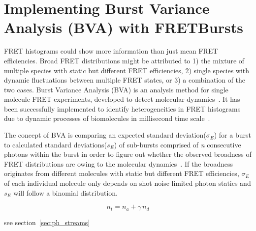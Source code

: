 \section{Implementing Burst Variance Analysis (BVA) with FRETBursts}

FRET histograms could show more information than just mean FRET efficiencies. Broad FRET distributions might be attributed to 1) the mixture of multiple species with static but different FRET efficiencies, 2) single species with dynamic fluctuations between multiple FRET states, or 3) a combination of the two cases. Burst Variance Analysis (BVA) is an analysis method for single molecule FRET experiments, developed to detect molecular dynamics~\cite{Torella_2011}. It has been successfully implemented to identify heterogeneities in FRET histograms due to dynamic processes of biomolecules in millisecond time scale~\cite{Torella_2011, Robb_2013}.

The concept of BVA is comparing an expected standard deviation($\sigma_E$) for a burst to calculated standard deviations($s_E$) of sub-bursts comprised of \textit{n} consecutive photons within the burst in order to figure out whether the observed broadness of FRET distributions are owing to the molecular dynamics~\cite{Torella_2011}. If the broadness originates from different molecules with static but different FRET efficiencies, $\sigma_E$ of each individual molecule only depends on shot noise limited photon statics and $s_E$ will follow a binomial distribution.  

$$ n_t = n_a + \gamma\,n_d$$ 

see section~\ref{sec:ph_streams}